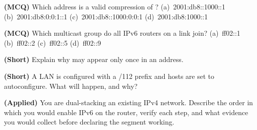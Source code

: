 \begin{reviewq}
  \item \textbf{(MCQ)} Which address is a valid compression of
        ?
        (a)~2001:db8::1000::1 (b)~2001:db8:0:0:1::1 (c)~2001:db8::1000:0:0:1
        (d)~2001:db8:1000::1
  \item \textbf{(MCQ)} Which multicast group do all IPv6 routers on a link join?
        (a)~ff02::1 (b)~ff02::2 (c)~ff02::5 (d)~ff02::9
  \item \textbf{(Short)} Explain why \cmd{::} may appear only once in an address.
  \item \textbf{(Short)} A LAN is configured with a /112 prefix and hosts are set
        to autoconfigure. What will happen, and why?
  \item \textbf{(Applied)} You are dual-stacking an existing IPv4 network.
        Describe the order in which you would enable IPv6 on the router,
        verify each step, and what evidence you would collect before declaring
        the segment working.
\end{reviewq}
